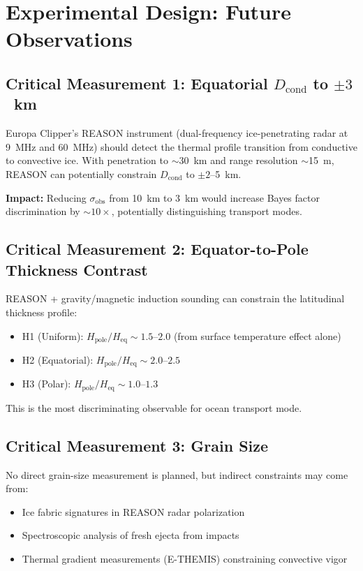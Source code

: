 \documentclass[11pt,letterpaper]{article}
\begin{document}
\section{Experimental Design: Future Observations}
\label{app:experiments}

\subsection{Critical Measurement 1: Equatorial $D_\mathrm{cond}$ to $\pm 3$~km}

Europa Clipper's REASON instrument (dual-frequency ice-penetrating radar at 9~MHz and 60~MHz) should detect the thermal profile transition from conductive to convective ice. With penetration to $\sim$30~km and range resolution $\sim$15~m, REASON can potentially constrain $D_\mathrm{cond}$ to $\pm 2$--5~km.

\textbf{Impact:} Reducing $\sigma_\mathrm{obs}$ from 10~km to 3~km would increase Bayes factor discrimination by $\sim 10\times$, potentially distinguishing transport modes.

\subsection{Critical Measurement 2: Equator-to-Pole Thickness Contrast}

REASON + gravity/magnetic induction sounding can constrain the latitudinal thickness profile:
\begin{itemize}[nosep]
  \item H1 (Uniform): $H_\mathrm{pole}/H_\mathrm{eq} \sim 1.5$--$2.0$ (from surface temperature effect alone)
  \item H2 (Equatorial): $H_\mathrm{pole}/H_\mathrm{eq} \sim 2.0$--$2.5$
  \item H3 (Polar): $H_\mathrm{pole}/H_\mathrm{eq} \sim 1.0$--$1.3$
\end{itemize}
This is the most discriminating observable for ocean transport mode.

\subsection{Critical Measurement 3: Grain Size}

No direct grain-size measurement is planned, but indirect constraints may come from:
\begin{itemize}[nosep]
  \item Ice fabric signatures in REASON radar polarization
  \item Spectroscopic analysis of fresh ejecta from impacts
  \item Thermal gradient measurements (E-THEMIS) constraining convective vigor
\end{itemize}
\end{document}
